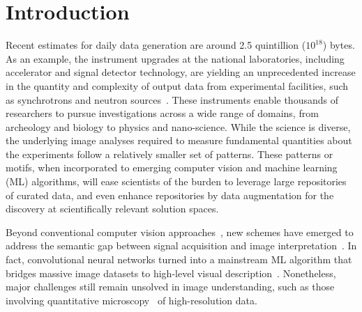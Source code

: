 \section{Introduction}
Recent estimates for daily data generation are around 2.5 quintillion ($10^{18}$) bytes. As an example, the instrument upgrades at the national laboratories, including accelerator and signal detector technology, are yielding an unprecedented increase in the quantity and complexity of output data from experimental facilities, such as synchrotrons and neutron sources~\cite{EOD:2015}. These instruments enable thousands of researchers to pursue investigations across a wide range of domains, from archeology and biology to physics and nano-science. While the science is diverse, the underlying image analyses required to measure fundamental quantities about the experiments follow a relatively smaller set of patterns. These patterns or motifs, when incorporated to emerging computer vision and machine learning (ML) algorithms, will ease scientists of the burden to leverage large repositories of curated data, and even enhance repositories by data augmentation for the discovery at scientifically relevant solution spaces.


Beyond conventional computer vision approaches~\cite{Ballard, Gonzalez, AFM:2015}, new schemes have emerged to address the semantic gap between signal acquisition and image interpretation~\cite{Zhang:2016:a}. In fact, convolutional neural networks turned into a mainstream ML algorithm that bridges massive image datasets to high-level visual description~\cite{Fei:2015}. Nonetheless, major challenges still remain unsolved in image understanding, such as those involving quantitative microscopy~\cite{Ushizima2016} of high-resolution data.


